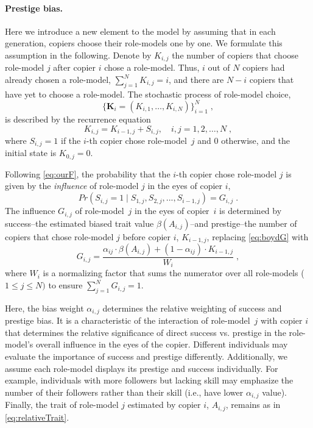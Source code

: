 \documentclass[12pt]{extarticle}
\let\vec\mathbf
\begin{document}
\paragraph{Prestige bias.}
Here we introduce a new element to the model by assuming that in each generation, copiers choose their role-models one by one.
We formulate this assumption in the following.
Denote by $K_{i,j}$  the number of copiers that choose role-model $j$ after copier $i$ chose a role-model. Thus, $i$ out of $N$ copiers had already chosen a role-model, $\sum_{j=1}^N{K_{i,j}} = i$, and there are $N-i$ copiers that have yet to choose a role-model.
The stochastic process of role-model choice, 
\begin{equation} \label{eq:process}
\big\{\vec{K}_i = (K_{i,1}, \ldots, K_{i,N}) \big\}_{i=1}^N \;,
\end{equation}
is described by the recurrence equation
\begin{equation} \label{eq:recurrence}
K_{i,j} = K_{i-1,j} + S_{i,j}, \quad i,j=1,2,\ldots,N \;,
\end{equation}
where $S_{i,j}=1$ if the $i$-th copier chose role-model~$j$ and 0 otherwise, and the initial state is $K_{0,j}=0$.

Following \cref{eq:ourF}, the probability that the $i$-th copier chose role-model $j$ is given by the \emph{influence} of role-model $j$ in the eyes of copier $i$,
\begin{equation}\label{eq:recPrestige}
Pr(S_{i,j}=1 \mid S_{1,j},S_{2,j},...,S_{i-1,j}) = G_{i,j} \;.
\end{equation}
The influence $G_{i,j}$ of role-model~$j$ in the eyes of copier~$i$ is determined by success--the estimated biased trait value $\beta(A_{i,j})$--and prestige--the number of copiers that chose role-model $j$ before copier $i$, $K_{i-1,j}$, replacing \cref{eq:boydG} with
\begin{equation}\label{eq:prestige}
G_{i,j} = \frac{\alpha_{ij} \cdot \beta(A_{i,j}) + (1-\alpha_{ij}) \cdot K_{i-1,j}}{W_i} \;,
\end{equation}
where $W_i$ is a normalizing factor that sums the numerator over all role-models ($1\le j \le N)$ to ensure $\sum_{j=1}^{N}{G_{i,j}}=1$.

Here, the bias weight $\alpha_{i,j}$ determines the relative weighting of success and prestige bias. It is a characteristic of the interaction of role-model~$j$ with copier $i$ that determines the relative significance of direct success vs. prestige in the role-model's overall influence in the eyes of the copier.
Different individuals may evaluate the importance of success and prestige differently. Additionally, we assume each role-model displays its prestige and success individually. For example, individuals with more followers but lacking skill may emphasize the number of their followers rather than their skill (i.e., have lower $\alpha_{i,j}$ value).
Finally, the trait of role-model $j$ estimated by copier $i$, $A_{i,j}$, remains as in \cref{eq:relativeTrait}.
\end{document}

